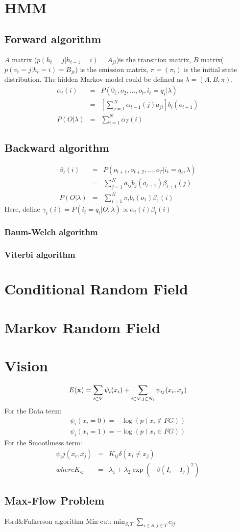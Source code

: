 \documentclass[12pt,a4paper]{article}
\begin{document}
\section*{HMM}
\subsection*{Forward algorithm}
$A$ matrix ($p(h_t=j|h_{t-1}=i)=A_{ji}$)is the transition matrix, $B$ matrix($p(v_t=j|h_t=i)=B_{ji}$) is the emission matrix, $\pi=(\pi_i)$ is the initial state distribution. The hidden Markov model could be defined as $\lambda=(A,B,\pi)$.
\begin{eqnarray*}
\alpha_t(i) &=& P(0_1,o_2,\ldots,o_t,i_t=q_i|\lambda) \\
&=& [\sum_{j=1}^{N}\alpha_{t-1}(j)a_{ji}]b_i(o_{t+1}) \\
P(O|\lambda) &=& \sum_{i=1}^{N}\alpha_{T}(i)
\end{eqnarray*}
\subsection*{Backward algorithm}
\begin{eqnarray*}
\beta_t(i) &=& P(o_{t+1},o_{t+2},\ldots,o_T|i_t=q_i,\lambda)\\
 &=& \sum_{j=1}^{N}a_{ij}b_j(o_{t+1})\beta_{t+1}(j)\\
 P(O|\lambda) &=& \sum_{i=1}^{N}\pi_ib_i(o_1)\beta_1(i)
\end{eqnarray*}
Here, define $\gamma_t(i)=P(i_t=q_i|O,\lambda)\propto \alpha_t(i)\beta_t(i)$

\subsubsection*{Baum-Welch algorithm}
\subsubsection*{Viterbi algorithm}
\section{Conditional Random Field}
\section{Markov Random Field}
\section{Vision}
$$
E({\bf x}) = \sum_{i\in V}\psi_i(x_i)+\sum_{i\in V,j\in N_i}\psi_{ij}(x_i,x_j)
$$
For the Data term:
\begin{eqnarray*}
\psi_i(x_i=0) = -\log(p(x_i\notin FG))\\
\psi_i(x_i=1) = -\log(p(x_i\in FG))
\end{eqnarray*}
For the Smoothness term:
\begin{eqnarray*}
\psi_ij(x_i,x_j)&=&K_{ij}\delta(x_i\neq x_j)\\
where K_{ij}&=&\lambda_1+\lambda_2\exp(-\beta(I_i-I_j)^2)
\end{eqnarray*}
\subsection*{Max-Flow Problem}
Ford\&Fulkerson algorithm
Min-cut:$\min_{S,T}\sum_{i\in S,j\in T}c_{ij}$
\end{document}
